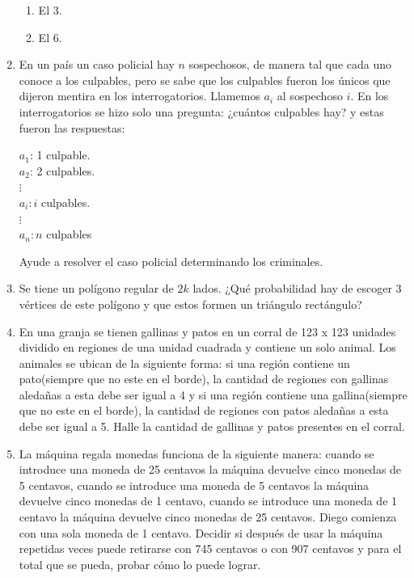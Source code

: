 \documentclass{book}
\begin{document}
\begin{enumerate}
          \begin{enumerate}
              \item El 3.
              \item El 6.
          \end{enumerate}
    \item En un país un caso policial hay $n$ sospechosos, de manera tal que cada uno conoce a los culpables, pero se sabe que los culpables fueron los únicos que dijeron mentira en los interrogatorios. Llamemos $a_i$ al sospechoso $i$. En los interrogatorios se hizo solo una pregunta: ¿cuántos culpables hay? y estas fueron las respuestas:
          \begin{center}
              $a_1$: 1 culpable.\\
              $a_2$: 2 culpables.\\
              $\vdots$\\
              $a_i: i$ culpables.\\
              $\vdots$\\
              $a_n: n$ culpables
          \end{center}
          Ayude a resolver el caso policial determinando los criminales.
    \item Se tiene un polígono regular de $2k$ lados. ¿Qué probabilidad hay de escoger 3 vértices de este polígono y que estos formen un triángulo rectángulo?
    \item En una granja se tienen gallinas y patos en un corral de 123 x 123 unidades dividido en regiones de una unidad cuadrada y contiene un solo animal. Los animales se ubican de la siguiente forma: si una región contiene un pato(siempre que no este en el borde), la cantidad de regiones con gallinas aledañas a esta debe ser igual a 4 y si una región contiene una gallina(siempre que no este en el borde), la cantidad de regiones con patos aledañas a esta debe ser igual a 5. Halle la cantidad de gallinas y patos presentes en el corral.
    \item La máquina regala monedas funciona de la siguiente manera: cuando se introduce una moneda de 25 centavos la máquina devuelve cinco monedas de 5 centavos, cuando se introduce una moneda de 5 centavos la máquina devuelve cinco monedas de 1 centavo, cuando se introduce una moneda de 1 centavo la máquina devuelve cinco monedas de 25 centavos. Diego comienza con una sola moneda de 1 centavo. Decidir si después de usar la máquina repetidas veces puede retirarse con 745 centavos o con 907 centavos y para el total que se pueda, probar cómo lo puede lograr.

\end{enumerate}
\end{document}
